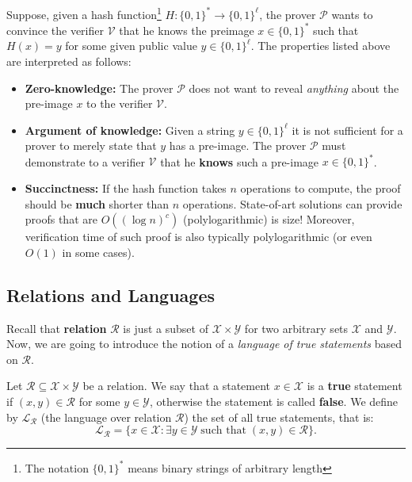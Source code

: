 \documentclass[../lecture-notes.tex]{subfiles}
\begin{document}
\begin{example}
    Suppose, given a hash function\footnote{The notation $\{0,1\}^*$ means binary strings of arbitrary length} $H: \{0,1\}^* \to \{0,1\}^{\ell}$, the prover $\mathcal{P}$ wants to convince the verifier $\mathcal{V}$ that he knows the preimage $x \in \{0,1\}^*$ such that $H(x) = y$ for some given public value $y \in \{0,1\}^{\ell}$. The properties listed above are interpreted as follows:
    \begin{itemize}
        \item \textbf{Zero-knowledge:} The prover $\mathcal{P}$ does not want to reveal \textit{anything} about the pre-image $x$ to the verifier $\mathcal{V}$.
        \item \textbf{Argument of knowledge:} Given a string $y \in \{0,1\}^{\ell}$ it is not sufficient for a prover to merely state that $y$ has a pre-image. The prover $\mathcal{P}$ must demonstrate to a verifier $\mathcal{V}$ that he \textbf{knows} such a pre-image $x \in \{0,1\}^*$.
        \item \textbf{Succinctness:} If the hash function takes $n$ operations to compute, the proof should be \textbf{much} shorter than $n$ operations. State-of-art solutions can provide proofs that are $O((\log n)^c)$ (polylogarithmic) is size! Moreover, verification time of such proof is also typically polylogarithmic (or even $O(1)$ in some cases).
    \end{itemize}
\end{example}

\subsection{Relations and Languages}
Recall that \textbf{relation} $\mathcal{R}$ is just a subset of $\mathcal{X} \times \mathcal{Y}$ for two arbitrary sets $\mathcal{X}$ and $\mathcal{Y}$. Now, we are going to introduce the notion of a \emph{language of true statements} based on $\mathcal{R}$.

\begin{definition}
    Let $\mathcal{R} \subseteq \mathcal{X} \times \mathcal{Y}$ be a relation. We say that a statement $x \in \mathcal{X}$ is a \textbf{true} statement if $(x,y) \in \mathcal{R}$ for some $y \in \mathcal{Y}$, otherwise the statement is called \textbf{false}. We define by $\mathcal{L}_{\mathcal{R}}$ (the language over relation $\mathcal{R}$) the set of all true statements, that is:
    \begin{equation*}
        \mathcal{L}_{\mathcal{R}} = \{ x \in \mathcal{X}: \exists y \in \mathcal{Y} \; \text{such that} \; (x,y) \in \mathcal{R} \}.
    \end{equation*}
\end{definition}
\end{document}
